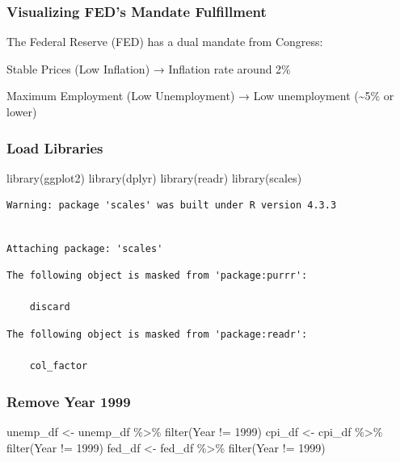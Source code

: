 \documentclass[
  letterpaper,
  DIV=11,
  numbers=noendperiod]{scrartcl}
\newenvironment{Shaded}{\begin{snugshade}}{\end{snugshade}}
\newcommand{\DecValTok}[1]{\textcolor[rgb]{0.68,0.00,0.00}{#1}}
\newcommand{\FunctionTok}[1]{\textcolor[rgb]{0.28,0.35,0.67}{#1}}
\newcommand{\NormalTok}[1]{\textcolor[rgb]{0.00,0.23,0.31}{#1}}
\newcommand{\OtherTok}[1]{\textcolor[rgb]{0.00,0.23,0.31}{#1}}
\newcommand{\SpecialCharTok}[1]{\textcolor[rgb]{0.37,0.37,0.37}{#1}}
\begin{document}
\subsubsection{Visualizing FED's Mandate
Fulfillment}\label{visualizing-feds-mandate-fulfillment}

The Federal Reserve (FED) has a dual mandate from Congress:

Stable Prices (Low Inflation) → Inflation rate around 2\%

Maximum Employment (Low Unemployment) → Low unemployment
(\textasciitilde5\% or lower)

\subsubsection{Load Libraries}\label{load-libraries-1}

\begin{Shaded}
\begin{Highlighting}[]
\FunctionTok{library}\NormalTok{(ggplot2)  }
\FunctionTok{library}\NormalTok{(dplyr)     }
\FunctionTok{library}\NormalTok{(readr)     }
\FunctionTok{library}\NormalTok{(scales)    }
\end{Highlighting}
\end{Shaded}

\begin{verbatim}
Warning: package 'scales' was built under R version 4.3.3
\end{verbatim}

\begin{verbatim}

Attaching package: 'scales'
\end{verbatim}

\begin{verbatim}
The following object is masked from 'package:purrr':

    discard
\end{verbatim}

\begin{verbatim}
The following object is masked from 'package:readr':

    col_factor
\end{verbatim}

\subsubsection{Remove Year 1999}\label{remove-year-1999}

\begin{Shaded}
\begin{Highlighting}[]
\NormalTok{unemp\_df }\OtherTok{\textless{}{-}}\NormalTok{ unemp\_df }\SpecialCharTok{\%\textgreater{}\%} \FunctionTok{filter}\NormalTok{(Year }\SpecialCharTok{!=} \DecValTok{1999}\NormalTok{)}
\NormalTok{cpi\_df }\OtherTok{\textless{}{-}}\NormalTok{ cpi\_df }\SpecialCharTok{\%\textgreater{}\%} \FunctionTok{filter}\NormalTok{(Year }\SpecialCharTok{!=} \DecValTok{1999}\NormalTok{)}
\NormalTok{fed\_df }\OtherTok{\textless{}{-}}\NormalTok{ fed\_df }\SpecialCharTok{\%\textgreater{}\%} \FunctionTok{filter}\NormalTok{(Year }\SpecialCharTok{!=} \DecValTok{1999}\NormalTok{)}
\end{Highlighting}
\end{Shaded}
\end{document}
